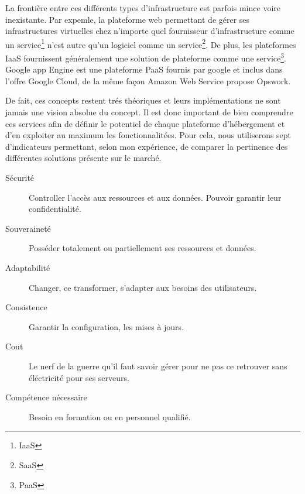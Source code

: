 \documentclass[11pt, a4paper ]{report}
\begin{document}
La frontière entre ces différents types d'infrastructure est parfois mince voire inexistante. Par expemle, la plateforme web permettant de gérer ses infrastructures virtuelles chez n'importe quel fournisseur d'infrastructure comme un service\footnote{IaaS} n'est autre qu'un logiciel comme un service\footnote{SaaS}. De plus, les plateformes IaaS fournissent généralement une solution de plateforme comme une service\footnote{PaaS}. Google app Engine est une plateforme PaaS fournis par google et inclus dans l'offre Google Cloud, de la même façon Amazon Web Service propose Opswork. 

De fait, ces concepts restent trés théoriques et leurs implémentations ne sont jamais une vision absolue du concept. Il est donc important de bien comprendre ces services afin de définir le potentiel de chaque plateforme d'hébergement et d'en exploiter au maximum les fonctionnalitées. 
Pour cela, nous utiliserons sept d'indicateurs permettant, selon mon expérience, de comparer la pertinence des différentes solutions présente sur le marché. 

\begin{description}

	\item[Sécurité] 
		Controller l'accès aux ressources et aux données. Pouvoir garantir leur confidentialité.

	\item[Souveraineté]  
		Posséder totalement ou partiellement ses ressources et données.

	\item[Adaptabilité]
		Changer, ce transformer, s'adapter aux besoins des utilisateurs.

	\item[Consistence]
		Garantir la configuration, les mises à jours.

	\item[Cout]
		Le nerf de la guerre qu'il faut savoir gérer pour ne pas ce retrouver sans éléctricité pour ses serveurs.

	\item[Compétence nécessaire]
		Besoin en formation ou en personnel qualifié.

\end{description}
\end{document}
